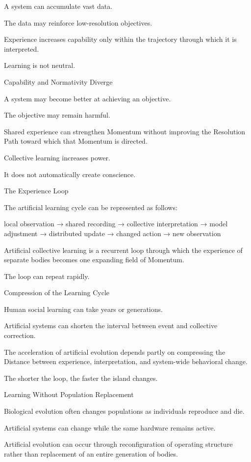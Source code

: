 A system can accumulate vast data.

The data may reinforce low-resolution objectives.

Experience increases capability only within the trajectory through which it is interpreted.

Learning is not neutral.

Capability and Normativity Diverge

A system may become better at achieving an objective.

The objective may remain harmful.

Shared experience can strengthen Momentum without improving the Resolution Path toward which that Momentum is directed.

Collective learning increases power.

It does not automatically create conscience.

The Experience Loop

The artificial learning cycle can be represented as follows:

local observation
→ shared recording
→ collective interpretation
→ model adjustment
→ distributed update
→ changed action
→ new observation

Artificial collective learning is a recurrent loop through which the experience of separate bodies becomes one expanding field of Momentum.

The loop can repeat rapidly.

Compression of the Learning Cycle

Human social learning can take years or generations.

Artificial systems can shorten the interval between event and collective correction.

The acceleration of artificial evolution depends partly on compressing the Distance between experience, interpretation, and system-wide behavioral change.

The shorter the loop, the faster the island changes.

Learning Without Population Replacement

Biological evolution often changes populations as individuals reproduce and die.

Artificial systems can change while the same hardware remains active.

Artificial evolution can occur through reconfiguration of operating structure rather than replacement of an entire generation of bodies.

